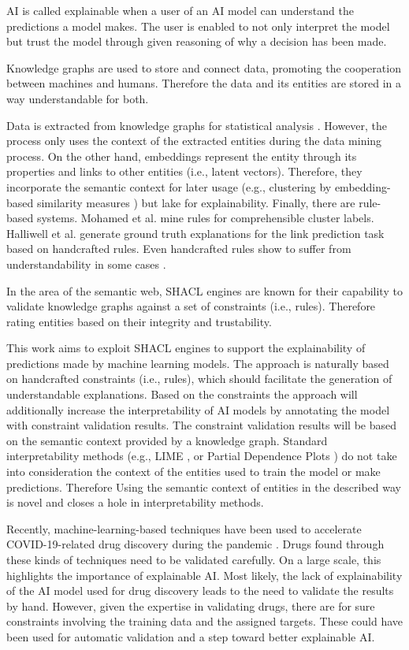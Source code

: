 AI is called explainable when a user of an AI model can understand the predictions a model makes. The user is enabled to not only interpret the model but trust the model through given reasoning of why a decision has been made. \cite{ibmExplainableAI, gilpin2018explaining} 

Knowledge graphs are used to store and connect data, promoting the cooperation between machines and humans. Therefore the data and its entities are stored in a way understandable for both. \cite{berners2002new}

Data is extracted from knowledge graphs for statistical analysis \cite{moghaddam2021literal2feature,cheng2011automated,narasimha2011liddm}. However, the process only uses the context of the extracted entities during the data mining process. On the other hand, embeddings represent the entity through its properties and links to other entities (i.e., latent vectors). Therefore, they incorporate the semantic context for later usage (e.g., clustering by embedding-based similarity measures \cite{embedding_similarity_measure}) but lake for explainability.
Finally, there are rule-based systems. Mohamed et al. \cite{excut} mine rules for comprehensible cluster labels. Halliwell et al. \cite{Halliwell2021} generate ground truth explanations for the link prediction task based on handcrafted rules. Even handcrafted rules show to suffer from understandability in some cases \cite{Halliwell2021}. 

In the area of the semantic web, SHACL engines are known for their capability to validate knowledge graphs against a set of constraints (i.e., rules). Therefore rating entities based on their integrity and trustability. 

This work aims to exploit SHACL engines to support the explainability of predictions made by machine learning models. The approach is naturally based on handcrafted constraints (i.e., rules), which should facilitate the generation of understandable explanations. Based on the constraints the approach will additionally increase the interpretability of AI models by annotating the model with constraint validation results. The constraint validation results will be based on the semantic context provided by a knowledge graph. 
Standard interpretability methods (e.g., LIME \cite{ribeiro2016should}, or Partial Dependence Plots \cite{friedman2001greedy}) do not take into consideration the context of the entities used to train the model or make predictions. Therefore Using the semantic context of entities in the described way is novel and closes a hole in interpretability methods. 

Recently, machine-learning-based techniques have been used to accelerate COVID-19-related drug discovery during the pandemic \cite{zhang2021ai}. Drugs found through these kinds of techniques need to be validated carefully. On a large scale, this highlights the importance of explainable AI. Most likely, the lack of explainability of the AI model used for drug discovery leads to the need to validate the results by hand. However, given the expertise in validating drugs, there are for sure constraints involving the training data and the assigned targets. These could have been used for automatic validation and a step toward better explainable AI. 
    